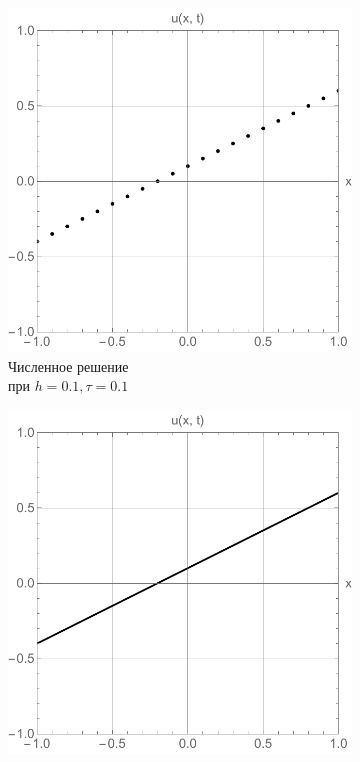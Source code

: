 \documentclass[12pt, a4paper]{article}
\begin{document}
\clearpage
\begin{figure}[!hp]
	\centering
	\begin{subfigure}[t]{0.32\textwidth}
		\centering
		\includegraphics[width=\textwidth]{res3_2}
		\caption{Численное решение  \\при $h = 0.1, \tau = 0.1$ }
		\label{test1}
	\end{subfigure}
	\hfill
	\begin{subfigure}[t]{0.32\textwidth}
		\centering
		\includegraphics[width=\textwidth]{res3_1}

\end{subfigure}
\end{figure}
\end{document}
